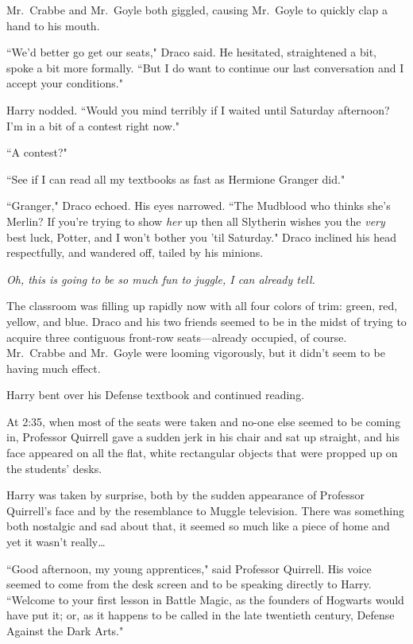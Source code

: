 Mr.~Crabbe and Mr.~Goyle both giggled, causing Mr.~Goyle to quickly clap a hand to his mouth.

``We'd better go get our seats," Draco said. He hesitated, straightened a bit, spoke a bit more formally. ``But I do want to continue our last conversation and I accept your conditions."

Harry nodded. ``Would you mind terribly if I waited until Saturday afternoon? I'm in a bit of a contest right now."

``A contest?"

``See if I can read all my textbooks as fast as Hermione Granger did."

``Granger," Draco echoed. His eyes narrowed. ``The Mudblood who thinks she's Merlin? If you're trying to show \emph{her} up then all Slytherin wishes you the \emph{very} best luck, Potter, and I won't bother you 'til Saturday." Draco inclined his head respectfully, and wandered off, tailed by his minions.

\emph{Oh, this is going to be \emph{so} much fun to juggle, I can already tell.}

The classroom was filling up rapidly now with all four colors of trim: green, red, yellow, and blue. Draco and his two friends seemed to be in the midst of trying to acquire three contiguous front-row seats—already occupied, of course. Mr.~Crabbe and Mr.~Goyle were looming vigorously, but it didn't seem to be having much effect.

Harry bent over his Defense textbook and continued reading.

\later

At 2:35\pm, when most of the seats were taken and no-one else seemed to be coming in, Professor Quirrell gave a sudden jerk in his chair and sat up straight, and his face appeared on all the flat, white rectangular objects that were propped up on the students' desks.

Harry was taken by surprise, both by the sudden appearance of Professor Quirrell's face and by the resemblance to Muggle television. There was something both nostalgic and sad about that, it seemed so much like a piece of home and yet it wasn't really{\ldots}

``Good afternoon, my young apprentices," said Professor Quirrell. His voice seemed to come from the desk screen and to be speaking directly to Harry. ``Welcome to your first lesson in Battle Magic, as the founders of Hogwarts would have put it; or, as it happens to be called in the late twentieth century, Defense Against the Dark Arts."


